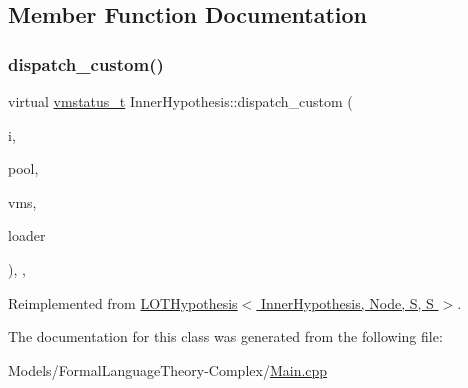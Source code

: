 \subsection{Member Function Documentation}
\mbox{\label{class_inner_hypothesis_a73c38e91c7c1bf021cbc8f9e5a758d13}} 
\subsubsection{\texorpdfstring{dispatch\+\_\+custom()}{dispatch\_custom()}}
{\footnotesize\ttfamily virtual \hyperlink{_instruction_8h_a6202215407ab29590bb936ca2996cf64}{vmstatus\+\_\+t} Inner\+Hypothesis\+::dispatch\+\_\+custom (\begin{DoxyParamCaption}\item[{\hyperlink{class_instruction}{Instruction}}]{i,  }\item[{\hyperlink{class_virtual_machine_pool}{Virtual\+Machine\+Pool}$<$ \hyperlink{_formal_language_theory-_complex_2_main_8cpp_a51c40915539205f0b5add30b0d68a4cb}{S}, \hyperlink{_formal_language_theory-_complex_2_main_8cpp_a51c40915539205f0b5add30b0d68a4cb}{S} $>$ $\ast$}]{pool,  }\item[{\hyperlink{class_virtual_machine_state}{Virtual\+Machine\+State}$<$ \hyperlink{_formal_language_theory-_complex_2_main_8cpp_a51c40915539205f0b5add30b0d68a4cb}{S}, \hyperlink{_formal_language_theory-_complex_2_main_8cpp_a51c40915539205f0b5add30b0d68a4cb}{S} $>$ $\ast$}]{vms,  }\item[{\hyperlink{class_dispatchable}{Dispatchable}$<$ \hyperlink{_formal_language_theory-_complex_2_main_8cpp_a51c40915539205f0b5add30b0d68a4cb}{S}, \hyperlink{_formal_language_theory-_complex_2_main_8cpp_a51c40915539205f0b5add30b0d68a4cb}{S} $>$ $\ast$}]{loader }\end{DoxyParamCaption})\hspace{0.3cm}{\ttfamily [inline]}, {\ttfamily [override]}, {\ttfamily [virtual]}}



Reimplemented from \hyperlink{class_l_o_t_hypothesis_a9aade3ee6939a58e5d5b53505cfb2e7a}{L\+O\+T\+Hypothesis$<$ Inner\+Hypothesis, Node, S, S $>$}.



The documentation for this class was generated from the following file\+:\begin{DoxyCompactItemize}
\item 
Models/\+Formal\+Language\+Theory-\/\+Complex/\hyperlink{_formal_language_theory-_complex_2_main_8cpp}{Main.\+cpp}\end{DoxyCompactItemize}
